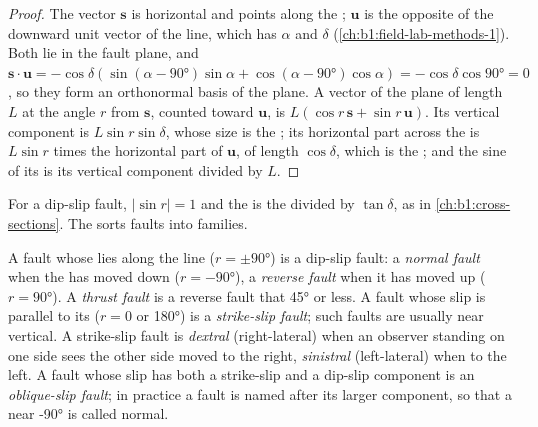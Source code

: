 \begin{proof}
The vector $\mathbf s$ is horizontal and points along the ; $\mathbf u$
is the opposite of the downward unit vector of the  line, which has 
$\alpha$ and  $\delta$ (\cref{ch:b1:field-lab-methods-1}). Both lie in
the fault plane, and $\mathbf s\cdot\mathbf u = -\cos\delta(\sin(\alpha -
\ang{90})\sin\alpha + \cos(\alpha - \ang{90})\cos\alpha) = -\cos\delta\cos\ang{90} = 0$,
so they form an orthonormal basis of the plane. A vector of the plane of
length $L$ at the angle $r$ from $\mathbf s$, counted toward $\mathbf u$, is
$L(\cos r\,\mathbf s + \sin r\,\mathbf u)$. Its vertical component is
$L\sin r\sin\delta$, whose size is the ; its horizontal part across the
 is $L\sin r$ times the horizontal part of $\mathbf u$, of length
$\cos\delta$, which is the ; and the sine of its  is its vertical
component divided by $L$.
\end{proof}

For a dip-slip fault, $|\sin r| = 1$ and the  is the  divided by
$\tan\delta$, as in \cref{ch:b1:cross-sections}. The  sorts faults into
families.

\begin{definition}\label{def:b1:faults-folds-fabrics:fault-types}
A fault whose  lies along the  line ($r = \pm\ang{90}$) is a
dip-slip fault: a \emph{normal fault} when the  has moved down ($r = \ang{-90}$), a \emph{reverse fault} when it has moved up ($r = \ang{90}$). A \emph{thrust
fault} is a reverse fault that  \ang{45} or less.
A fault whose slip is parallel to its  ($r = 0$ or \ang{180}) is a
\emph{strike-slip fault}; such faults are usually
near vertical. A strike-slip fault is \emph{dextral}
(right-lateral) when an observer standing on one side sees the other side
moved to the right, \emph{sinistral} (left-lateral) when to
the left. A fault whose slip has both a strike-slip and a dip-slip component
is an \emph{oblique-slip fault}; in practice a
fault is named after its larger component, so that a  near \ang{-90} is
called normal.
\end{definition}

